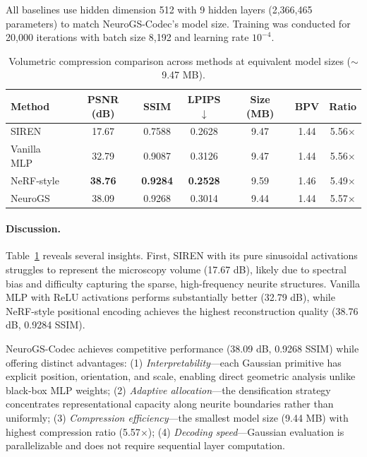 \documentclass[11pt,a4paper]{article}
\begin{document}
All baselines use hidden dimension 512 with 9 hidden layers (2,366,465 parameters) to match NeuroGS-Codec's model size. Training was conducted for 20,000 iterations with batch size 8,192 and learning rate $10^{-4}$.

\begin{table}[htbp]
\centering
\caption{Volumetric compression comparison across methods at equivalent model sizes ($\sim$9.47 MB).}
\label{tab:method_comparison}
\begin{tabular}{lcccccc}
\toprule
\textbf{Method} & \textbf{PSNR (dB)} & \textbf{SSIM} & \textbf{LPIPS$\downarrow$} & \textbf{Size (MB)} & \textbf{BPV} & \textbf{Ratio} \\
\midrule
SIREN & 17.67 & 0.7588 & 0.2628 & 9.47 & 1.44 & 5.56$\times$ \\
Vanilla MLP & 32.79 & 0.9087 & 0.3126 & 9.47 & 1.44 & 5.56$\times$ \\
NeRF-style & \textbf{38.76} & \textbf{0.9284} & \textbf{0.2528} & 9.59 & 1.46 & 5.49$\times$ \\
\midrule
NeuroGS & 38.09 & 0.9268 & 0.3014 & 9.44 & 1.44 & 5.57$\times$ \\
\bottomrule
\end{tabular}
\end{table}

\paragraph{Discussion.}
Table~\ref{tab:method_comparison} reveals several insights. First, SIREN with its pure sinusoidal activations struggles to represent the microscopy volume (17.67 dB), likely due to spectral bias and difficulty capturing the sparse, high-frequency neurite structures. Vanilla MLP with ReLU activations performs substantially better (32.79 dB), while NeRF-style positional encoding achieves the highest reconstruction quality (38.76 dB, 0.9284 SSIM).

NeuroGS-Codec achieves competitive performance (38.09 dB, 0.9268 SSIM) while offering distinct advantages: (1) \emph{Interpretability}---each Gaussian primitive has explicit position, orientation, and scale, enabling direct geometric analysis unlike black-box MLP weights; (2) \emph{Adaptive allocation}---the densification strategy concentrates representational capacity along neurite boundaries rather than uniformly; (3) \emph{Compression efficiency}---the smallest model size (9.44 MB) with highest compression ratio (5.57$\times$); (4) \emph{Decoding speed}---Gaussian evaluation is parallelizable and does not require sequential layer computation.
\end{document}

